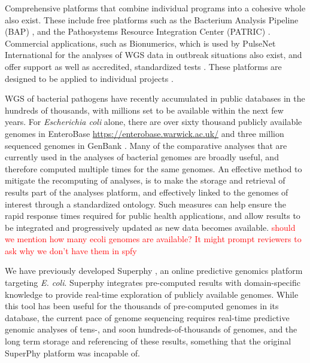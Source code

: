 \documentclass{article}
\newcommand\mwcomment[1]{\textcolor{red}{#1}}
\begin{document}
Comprehensive platforms that combine individual programs into a cohesive whole also exist. These include free platforms such as the Bacterium Analysis Pipeline (BAP) \cite{thomsen2016bacterial}, and the Pathosystems Resource Integration Center (PATRIC) \cite{wattam2013patric}. Commercial applications, such as Bionumerics, which is used by PulseNet International for the analyses of WGS data in outbreak situations also exist, and offer support as well as accredited, standardized tests \cite{swaminathan2001pulsenet}. These platforms are designed to be applied to individual projects \cite{}.

WGS of bacterial pathogens have recently accumulated in public databases in the hundreds of thousands, with millions set to be available within the next few years. For \textit{Escherichia coli} alone, there are over sixty thousand publicly available genomes in EnteroBase \url{https://enterobase.warwick.ac.uk/} and three million sequenced genomes in GenBank \cite{doi:10.1093/nar/gks1195}. Many of the comparative analyses that are currently used in the analyses of bacterial genomes are broadly useful, and therefore computed multiple times for the same genomes. An effective method to mitigate the recomputing of analyses, is to make the storage and retrieval of results part of the analyses platform, and effectively linked to the genomes of interest through a standardized ontology. Such measures can help ensure the rapid response times required for public health applications, and allow results to be integrated and progressively updated as new data becomes available.
\mwcomment{should we mention how many ecoli genomes are available? It might prompt reviewers to ask why we don't have them in spfy}

We have previously developed Superphy \cite{whiteside2016superphy}, an online predictive genomics platform targeting \textit{E. coli}. Superphy integrates pre-computed results with domain-specific knowledge to provide real-time exploration of publicly available genomes. While this tool has been useful for the thousands of pre-computed genomes in its database, the current pace of genome sequencing requires real-time predictive genomic analyses of tens-, and soon hundreds-of-thousands of genomes, and the long term storage and referencing of these results, something that the original SuperPhy platform was incapable of.

\end{document}
